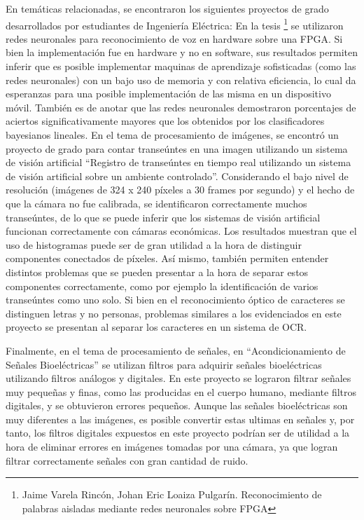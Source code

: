 \documentclass[a4paper, 11pt, oneside]{article}
\begin{document}
	En temáticas relacionadas, se encontraron los siguientes proyectos de grado desarrollados por 
    estudiantes de Ingeniería Eléctrica:    
    En la tesis \footnote{Jaime Varela Rincón, Johan Eric Loaiza Pulgarín. Reconocimiento de palabras
    aisladas mediante redes neuronales sobre FPGA} se utilizaron redes neuronales para reconocimiento
    de voz en hardware sobre una FPGA. 
    Si bien la implementación fue en hardware y no en software, sus resultados permiten inferir que es 
    posible implementar maquinas de aprendizaje sofisticadas (como las redes neuronales) con un bajo uso
    de memoria y con relativa eficiencia, lo cual da esperanzas para una posible implementación de las 
    misma en un dispositivo móvil. También es de anotar que las redes neuronales demostraron porcentajes 
    de aciertos significativamente mayores que los obtenidos por los clasificadores bayesianos lineales.
	\newline \newline
	En el tema de procesamiento de imágenes, se encontró un proyecto de grado para contar transeúntes en
    una imagen utilizando un sistema de visión artificial ``Registro de transeúntes en tiempo real utilizando
    un sistema de visión artificial sobre un ambiente controlado''. Considerando el bajo nivel de
	resolución (imágenes de 324 x 240 píxeles a 30 frames por segundo) y el hecho de que la cámara no
	fue calibrada, se identificaron correctamente muchos transeúntes, de lo que se puede inferir que los 
    sistemas de visión artificial funcionan correctamente con cámaras económicas. Los resultados muestran que
	el uso de histogramas puede ser de gran utilidad a la hora de distinguir componentes conectados de 
    píxeles. Así mismo, también permiten entender distintos problemas que se pueden presentar a la hora de
    separar estos componentes correctamente, como por ejemplo la identificación de varios transeúntes como 
    uno solo. Si bien en el reconocimiento óptico de caracteres se distinguen letras y no personas, problemas 
    similares a los evidenciados en este proyecto se presentan al separar los caracteres en un sistema de 
	OCR.\newline
	
	Finalmente, en el tema de procesamiento de señales, en ``Acondicionamiento de Señales Bioeléctricas''
	se utilizan filtros para adquirir señales bioeléctricas utilizando filtros análogos y digitales.
	En este proyecto se lograron filtrar señales muy pequeñas y finas, como las producidas en el cuerpo humano, 
	mediante filtros digitales, y se obtuvieron errores pequeños.
	Aunque las señales bioeléctricas son muy diferentes a las imágenes, es posible 
    convertir estas ultimas en señales y, por tanto, los filtros digitales expuestos en este proyecto podrían 
    ser de utilidad a la hora de eliminar errores en imágenes tomadas por una cámara, ya que logran filtrar
	correctamente señales con gran cantidad de ruido.\newline
	
\end{document}
